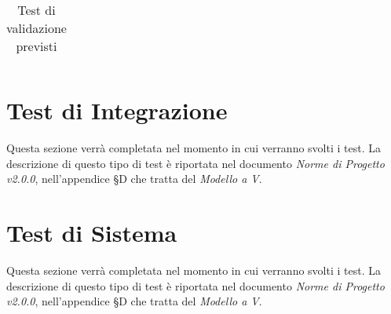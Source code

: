 \begin{longtable}{|C{.10\textwidth}|C{.12\textwidth}|C{.52\textwidth}|C{.12\textwidth}|}
\caption{Test di validazione previsti}
\label{testvalidazioneprevisti}
\end{longtable}




\newpage
\section{Test di Integrazione}
\label{test_i}
Questa sezione verrà completata nel momento in cui verranno svolti i test. La descrizione di questo tipo di test è riportata nel documento \textit{Norme di Progetto v2.0.0}, nell'appendice §D che tratta del \textit{Modello a V}.

\newpage
\section{Test di Sistema}
\label{test_s}
Questa sezione verrà completata nel momento in cui verranno svolti i test. La descrizione di questo tipo di test è riportata nel documento \textit{Norme di Progetto v2.0.0}, nell'appendice §D che tratta del \textit{Modello a V}.
\newpage